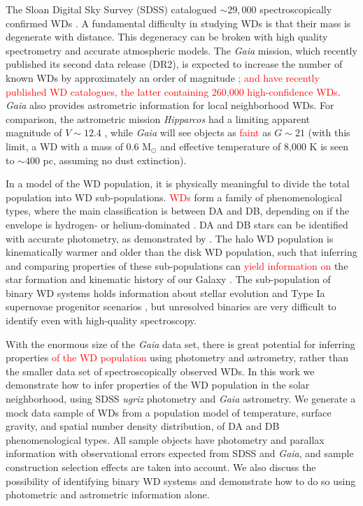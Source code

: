 \documentclass[fleqn,usenatbib]{mnras}
\newcommand{\changes}[1]{\textcolor{red}{#1}}
\begin{document}
The Sloan Digital Sky Survey (SDSS) catalogued ${\sim}29,000$ spectroscopically confirmed WDs \citep{2013ApJS..204....5K,2015MNRAS.446.4078K}. A fundamental difficulty in studying WDs is that their mass is degenerate with distance. This degeneracy can be broken with high quality spectrometry and accurate atmospheric models. The \emph{Gaia} mission, which recently published its second data release (DR2), is expected to increase the number of known WDs by approximately an order of magnitude \citep{Jordan:2006jg,2014A&A...565A..11C}\changes{; \cite{2018MNRAS.tmp.1537K} and \cite{2018arXiv180703315G} have recently published WD catalogues, the latter containing 260,000 high-confidence WDs}. \emph{Gaia} also provides astrometric information for local neighborhood WDs. For comparison, the astrometric mission \emph{Hipparcos} had a limiting apparent magnitude of $V \sim 12.4$ \citep{1997A&A...323L..49P}, while \emph{Gaia} will see objects as \changes{faint} as $G \sim 21$ (with this limit, a WD with a mass of 0.6 M$_\odot$ and effective temperature of 8,000 K is seen to ${\sim}400$ pc, assuming no dust extinction).

In a model of the WD population, it is physically meaningful to divide the total population into WD sub-populations. \changes{WDs} form a family of phenomenological types, where the main classification is between DA and DB, depending on if the envelope is hydrogen- or helium-dominated \citep{Tremblay:2007hq,2011ApJ...737...28B,2015A&A...583A..86K}. DA and DB stars can be identified with accurate photometry, as demonstrated by \cite{Mortlock:2008gf}. The halo WD population is kinematically warmer and older than the disk WD population, such that inferring and comparing properties of these sub-populations can \changes{yield information on} the star formation and kinematic history of our Galaxy \citep{1998ApJ...503..239I,2016MNRAS.463.2453D}. The sub-population of binary WD systems holds information about stellar evolution \citep{Webbink:2007ps} and Type Ia supernovae progenitor scenarios \citep{Livio:2018rue}, but unresolved binaries are very difficult to identify even with high-quality spectroscopy.

With the enormous size of the \emph{Gaia} data set, there is great potential for inferring properties \changes{of the WD population} using photometry and astrometry, rather than the smaller data set of spectroscopically observed WDs. In this work we demonstrate how to infer properties of the WD population in the solar neighborhood, using SDSS \emph{ugriz} photometry and \emph{Gaia} astrometry. We generate a mock data sample of WDs from a population model of temperature, surface gravity, and spatial number density distribution, of DA and DB phenomenological types. All sample objects have photometry and parallax information with observational errors expected from SDSS and \emph{Gaia}, and sample construction selection effects are taken into account. We also discuss the possibility of identifying binary WD systems and demonstrate how to do so using photometric and astrometric information alone.
\end{document}

